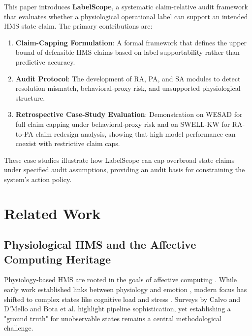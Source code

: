 \documentclass[journal]{IEEEtran}
\begin{document}
This paper introduces \textbf{LabelScope}, a systematic claim-relative audit framework that evaluates whether a physiological operational label can support an intended HMS state claim. The primary contributions are:
\begin{enumerate}
    \item \textbf{Claim-Capping Formulation}: A formal framework that defines the upper bound of defensible HMS claims based on label supportability rather than predictive accuracy.
    \item \textbf{Audit Protocol}: The development of RA, PA, and SA modules to detect resolution mismatch, behavioral-proxy risk, and unsupported physiological structure.
    \item \textbf{Retrospective Case-Study Evaluation}: Demonstration on WESAD for full claim capping under behavioral-proxy risk and on SWELL-KW for RA-to-PA claim redesign analysis, showing that high model performance can coexist with restrictive claim caps.
\end{enumerate}
These case studies illustrate how LabelScope can cap overbroad state claims under specified audit assumptions, providing an audit basis for constraining the system's action policy.

\section{Related Work}

\subsection{Physiological HMS and the Affective Computing Heritage}
Physiology-based HMS are rooted in the goals of affective computing \cite{picard1997}. While early work established links between physiology and emotion \cite{boucsein2012}, modern focus has shifted to complex states like cognitive load and stress \cite{zhang2024}. Surveys by Calvo and D'Mello \cite{Calvo2010} and Bota et al. \cite{Bota2019} highlight pipeline sophistication, yet establishing a "ground truth" for unobservable states remains a central methodological challenge.
\end{document}
